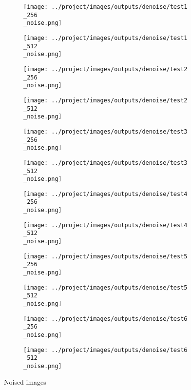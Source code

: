 \begin{figure}[!ht]
   \centering
\begin{subfigure}[t]{0.15\textwidth}
    \texttt{[image: ../project/images/outputs/denoise/test1\\\_256\\\_noise.png]}
    \caption{}
    \centering
  \end{subfigure}
\begin{subfigure}[t]{0.15\textwidth}
    \texttt{[image: ../project/images/outputs/denoise/test1\\\_512\\\_noise.png]}
    \caption{}
    \centering
  \end{subfigure}
\begin{subfigure}[t]{0.15\textwidth}
    \texttt{[image: ../project/images/outputs/denoise/test2\\\_256\\\_noise.png]}
    \caption{}
    \centering
  \end{subfigure}
\begin{subfigure}[t]{0.15\textwidth}
    \texttt{[image: ../project/images/outputs/denoise/test2\\\_512\\\_noise.png]}
    \caption{}
    \centering
  \end{subfigure}
\begin{subfigure}[t]{0.15\textwidth}
    \texttt{[image: ../project/images/outputs/denoise/test3\\\_256\\\_noise.png]}
    \caption{}
    \centering
  \end{subfigure}
\begin{subfigure}[t]{0.15\textwidth}
    \texttt{[image: ../project/images/outputs/denoise/test3\\\_512\\\_noise.png]}
    \caption{}
    \centering
  \end{subfigure}
\begin{subfigure}[t]{0.15\textwidth}
    \texttt{[image: ../project/images/outputs/denoise/test4\\\_256\\\_noise.png]}
    \caption{}
    \centering
  \end{subfigure}
\begin{subfigure}[t]{0.15\textwidth}
    \texttt{[image: ../project/images/outputs/denoise/test4\\\_512\\\_noise.png]}
    \caption{}
    \centering
  \end{subfigure}
\begin{subfigure}[t]{0.15\textwidth}
    \texttt{[image: ../project/images/outputs/denoise/test5\\\_256\\\_noise.png]}
    \caption{}
    \centering
  \end{subfigure}
\begin{subfigure}[t]{0.15\textwidth}
    \texttt{[image: ../project/images/outputs/denoise/test5\\\_512\\\_noise.png]}
    \caption{}
    \centering
  \end{subfigure}
\begin{subfigure}[t]{0.15\textwidth}
    \texttt{[image: ../project/images/outputs/denoise/test6\\\_256\\\_noise.png]}
    \caption{}
    \centering
  \end{subfigure}
\begin{subfigure}[t]{0.15\textwidth}
    \texttt{[image: ../project/images/outputs/denoise/test6\\\_512\\\_noise.png]}
    \caption{}
    \centering
  \end{subfigure}
 \caption{Noised images}
 \end{figure}
